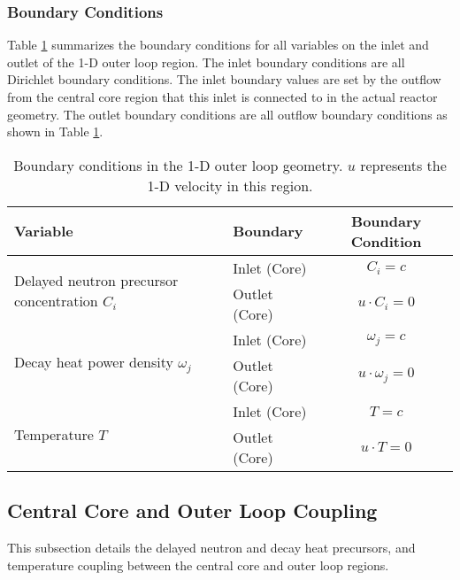 \subsubsection{Boundary Conditions}

Table \ref{table:loopbc} summarizes the boundary conditions for all variables
on the inlet and outlet of the 1-D outer loop region. The inlet boundary
conditions are all Dirichlet boundary conditions. The inlet boundary values
are set by the outflow from the central core region that this inlet is
connected to in the actual reactor geometry. The outlet boundary conditions
are all outflow boundary conditions as shown in Table \ref{table:loopbc}.

\begin{table}[htbp!]
    \small
	\caption{Boundary conditions in the 1-D outer loop geometry. $u$
	represents the 1-D velocity in this region.}
	\centering
	\begin{tabular}{ l l c}
		\toprule
		Variable & Boundary & Boundary Condition \\
        \midrule
        \multirow{2}{*}{Delayed neutron precursor concentration $C_i$} &
        Inlet (Core) & $C_i = c$ \\
        & Outlet (Core) & $u \cdot C_i = 0$ \\
        \midrule
        \multirow{2}{*}{Decay heat power density $\omega_j$} &
        Inlet (Core) & $\omega_j = c$ \\
        & Outlet (Core) & $u \cdot \omega_j = 0$ \\
        \midrule
        \multirow{2}{*}{Temperature $T$} &
        Inlet (Core) & $T = c$ \\
        & Outlet (Core) & $u \cdot T = 0$ \\
		\bottomrule
	\end{tabular}
	\label{table:loopbc}
\end{table}

\subsection{Central Core and Outer Loop Coupling}

This subsection details the delayed neutron and decay heat precursors, and
temperature coupling between the central core and outer loop regions. 


